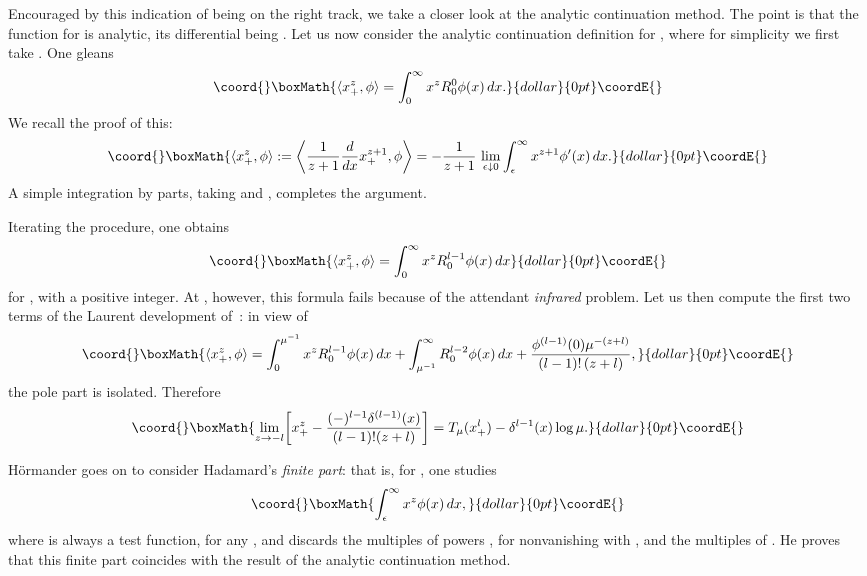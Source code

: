 \documentclass[a4paper,12pt]{article}
\providecommand{\C}{\mathbb{C}}        %
\providecommand{\dl}{\delta}           %
\providecommand{\eps}{\epsilon}        %
\providecommand{\7}{\dagger}           %
\def\<#1,#2>{\langle#1,#2\rangle}  %
\theoremstyle{plain}
\theoremstyle{definition}
\begin{document}
Encouraged by this indication of being on the right track, we take a
closer look at the analytic continuation method. The point is that the
function \coordHE{} for \coordHE{} is
analytic, its differential being
\coordHE{}. Let us now consider the
analytic continuation definition for \coordHE{}, where for simplicity we
first take \coordHE{}. One gleans
$$\coord{}\boxMath{
\<x^z_+, \phi> = \int_0^\infty x^z R^0_0\phi(x) \,dx.
}{dollar}{0pt}\coordE{}$$
We recall the proof of this:
$$\coord{}\boxMath{
\<x^z_+, \phi> :=
\biggl< \frac{1}{z+1} \frac{d}{dx} x^{z+1}_+, \phi\biggr> =
- \frac{1}{z+1}\,\lim_{\eps\downarrow0} \int_\eps^\infty
x^{z+1} \phi'(x)\,dx.
}{dollar}{0pt}\coordE{}$$
A simple integration by parts, taking \coordHE{} and
\coordHE{}, completes the argument.

Iterating the procedure, one obtains
$$\coord{}\boxMath{
\<x^z_+, \phi> = \int_0^\infty x^z R^{l-1}_0\phi(x)\,dx
}{dollar}{0pt}\coordE{}$$
for \coordHE{}, with \coordHE{} a positive integer. At \coordHE{},
however, this formula fails because of the attendant \textit{infrared}
problem. Let us then compute the first two terms of the Laurent
development of~\coordHE{}: in view of
$$\coord{}\boxMath{
\<x^z_+, \phi> = \int_0^{\mu^{-1}} x^z R^{l-1}_0\phi(x)\,dx +
\int_{\mu^{-1}}^\infty R^{l-2}_0\phi(x)\,dx
+ \frac{\phi^{(l-1)}(0)\mu^{-(z+l)}}{(l-1)!\,(z+l)},
}{dollar}{0pt}\coordE{}$$
the pole part is isolated. Therefore
$$\coord{}\boxMath{
\lim_{z\to-l} \biggl[x_+^z -
\frac{(-)^{l-1}\dl^{(l-1)}(x)}{(l-1)!(z+l)} \biggr] =
T_\mu(x^l_+) - \dl^{l-1}(x) \log\mu.
}{dollar}{0pt}\coordE{}$$

H\"ormander goes on to consider Hadamard's \textit{finite part}: that
is, for \coordHE{}, one studies
$$\coord{}\boxMath{
\int_\eps^\infty x^z \phi(x)\,dx,
}{dollar}{0pt}\coordE{}$$
where \myHighlight{$\phi$}\coordHE{} is always a test function, for any \myHighlight{$z \in \C$}\coordHE{}, and
discards the multiples of powers \myHighlight{$\eps^{-\theta}$}\coordHE{}, for nonvanishing
\myHighlight{$\theta$}\coordHE{} with \coordHE{}, and the multiples of \myHighlight{$\log\eps$}\coordHE{}.
He proves that this finite part coincides with the result of the
analytic continuation method.
\end{document}
